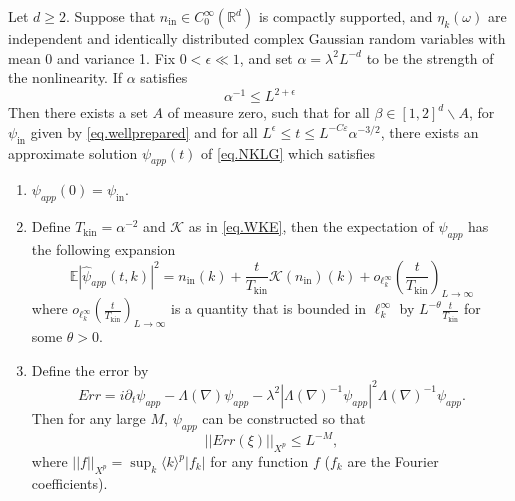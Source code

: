 \begin{thm}\label{th.main}
Let $d\ge 2$. Suppose that $n_{\mathrm{in}} \in C^\infty_0(\mathbb{R}^d)$ is compactly supported, and $\eta_k(\omega)$ are independent and identically distributed complex Gaussian random variables with mean 0 and variance 1. Fix $0<\epsilon\ll 1$, and set $\alpha=\lambda^2L^{-d}$ to be the strength of the nonlinearity. If $\alpha$ satisfies
\begin{equation}
\alpha^{-1}\le L^{2+\epsilon}
\end{equation}
Then there exists a set  $A$ of measure zero, such that for all $\beta\in [1,2]^d\backslash A$, for $\psi_{\mathrm{in}}$ given by \eqref{eq.wellprepared} and for all $L^{\epsilon} \leq t \leq L^{-C\varepsilon} \alpha^{-3/2}$, there exists an approximate solution $\psi_{app}(t)$ of \eqref{eq.NKLG} which satisfies


\medskip

\begin{enumerate}
    \item $\psi_{app}(0)=\psi_{\mathrm{in}}$.
    \item Define $T_{\mathrm{kin}}=\alpha^{-2}$ and $\mathcal K$ as in \eqref{eq.WKE}, then the expectation of $\psi_{app}$ has the following expansion \begin{equation}\label{approx2}
\mathbb E |\widehat \psi_{app}(t, k)|^2 =n_{\mathrm{in}}(k)+\frac{t}{T_{\mathrm{kin}}}\mathcal K(n_{\mathrm{in}})(k)+o_{\ell^\infty_k}\left(\frac{t}{T_{\mathrm {kin}}}\right)_{L \to \infty}
\end{equation}
where $o_{\ell^\infty_k}\left(\frac{t}{T_{\mathrm {kin}}}\right)_{L \to \infty}$ is a quantity that is bounded in $\ell^\infty_k$ by $L^{-\theta} \frac{t}{T_{\mathrm {kin}}}$ for some $\theta>0$.
    \item Define the error by
    \begin{equation}
        Err=i\partial_t\psi_{app}-\Lambda(\nabla)\psi_{app}-\lambda^2 |\Lambda(\nabla)^{-1}\psi_{app}|^2\Lambda(\nabla)^{-1}\psi_{app}.
    \end{equation}
    Then for any large $M$, $\psi_{app}$ can be constructed so that
    \begin{equation}
    ||Err(\xi)||_{X^p}\le L^{-M},
\end{equation}
where $||f||_{X^p}=\sup_{k} \langle k\rangle^{p} |f_k|$ for any function $f$ ($f_k$ are the Fourier coefficients).

\end{enumerate}


\end{thm}

